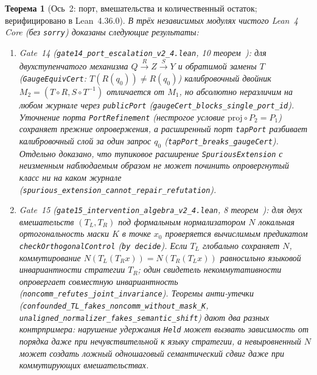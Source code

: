 \documentclass[11pt,a4paper]{article}
\theoremstyle{preprintthm}
\newtheorem{theorem}{Теорема}[section]
\theoremstyle{preprintdef}
\begin{document}
\begin{theorem}[Ось~2: порт, вмешательства и количественный остаток; верифицировано в Lean~4.36.0]
\label{thm:axis2}
В трёх независимых модулях чистого Lean~4 Core (без \texttt{sorry}) доказаны следующие результаты:
\begin{enumerate}
  \item \emph{Gate~14 (\texttt{gate14\_\allowbreak port\_\allowbreak escalation\_\allowbreak v2\_\allowbreak 4.lean}, 10 теорем~\cite{strand2026g14}):} для двухступенчатого механизма $Q\xrightarrow{R}Z\xrightarrow{S}Y$ и обратимой замены $T$ (\texttt{GaugeEquivCert}: $T(R(q_0))\ne R(q_0)$) калибровочный двойник $M_2=(T\circ R, S\circ T^{-1})$ отличается от $M_1$, но абсолютно неразличим на любом журнале через \texttt{publicPort} (\texttt{gaugeCert\_\allowbreak blocks\_\allowbreak single\_\allowbreak port\_\allowbreak id}). Уточнение порта \texttt{PortRefinement} (нестрогое условие $\mathrm{proj}\circ P_2 = P_1$) сохраняет прежние опровержения, а расширенный порт \texttt{tapPort} разбивает калибровочный слой за один запрос $q_0$ (\texttt{tapPort\_\allowbreak breaks\_\allowbreak gaugeCert}). Отдельно доказано, что тупиковое расширение \texttt{SpuriousExtension} с неизменным наблюдаемым образом не может починить опровергнутый класс ни на каком журнале (\texttt{spurious\_\allowbreak extension\_\allowbreak cannot\_\allowbreak repair\_\allowbreak refutation}).
  \item \emph{Gate~15 (\texttt{gate15\_\allowbreak intervention\_\allowbreak algebra\_\allowbreak v2\_\allowbreak 4.lean}, 8 теорем~\cite{strand2026g15}):} для двух вмешательств $(T_L, T_R)$ под формальным нормализатором $N$ локальная ортогональность маски $K$ в точке $x_0$ проверяется вычислимым предикатом \texttt{checkOrthogonalControl} (\texttt{by decide}). Если $T_L$ глобально сохраняет $N$, коммутирование $N(T_L(T_R x))=N(T_R(T_L x))$ равносильно языковой инвариантности стратегии $T_R$; один свидетель некоммутативности опровергает совместную инвариантность (\texttt{noncomm\_\allowbreak refutes\_\allowbreak joint\_\allowbreak invariance}). Теоремы анти-утечки (\texttt{confounded\_\allowbreak TL\_\allowbreak fakes\_\allowbreak noncomm\_\allowbreak without\_\allowbreak mask\_\allowbreak K}, \texttt{unaligned\_\allowbreak normalizer\_\allowbreak fakes\_\allowbreak semantic\_\allowbreak shift}) дают два разных контрпримера: нарушение удержания \texttt{Held} может вызвать зависимость от порядка даже при нечувствительной к языку стратегии, а невыровненный $N$ может создать ложный одношаговый семантический сдвиг даже при коммутирующих вмешательствах.

\end{enumerate}
\end{theorem}
\end{document}
